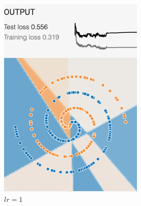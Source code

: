 \documentclass[12pt,a4paper]{article}
\begin{document}
\begin{enumerate}
\begin{figure}[H]
\begin{subfigure}[H]{0.2\textwidth}
				\includegraphics[width=\textwidth]{Figures/lr/1}
				\caption{$lr=1$}
			\end{subfigure}
			\begin{subfigure}[H]{0.2\textwidth}
				\centering

\end{subfigure}
\end{figure}
\end{enumerate}
\end{document}
